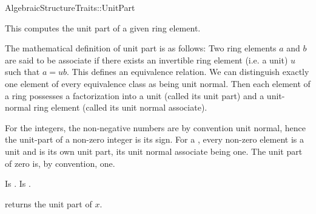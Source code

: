 \begin{ccRefFunctionObjectConcept}{AlgebraicStructureTraits::UnitPart}

\ccDefinition

This  computes the unit part of a given ring 
element. 

The mathematical definition of unit part is as follows: Two ring elements $a$ 
and $b$ are said to be associate if there exists an invertible ring element 
(i.e. a unit) $u$ such that $a = ub$. This defines an equivalence relation. 
We can distinguish exactly one element of every equivalence class as being 
unit normal. Then each element of a ring possesses a factorization into a unit 
(called its unit part) and a unit-normal ring element 
(called its unit normal associate).

For the integers, the non-negative numbers are by convention unit normal, 
hence the unit-part of a non-zero integer is its sign. For a , every 
non-zero element is a unit and is its own unit part, its unit normal 
associate being one. The unit part of zero is, by convention, one.

\ccRefines 


\ccTypes
{} 
        { Is .}
        { Is .}

\ccOperations
{}

{ returns the unit part of $x$.}


\ccSeeAlso


\end{ccRefFunctionObjectConcept}
